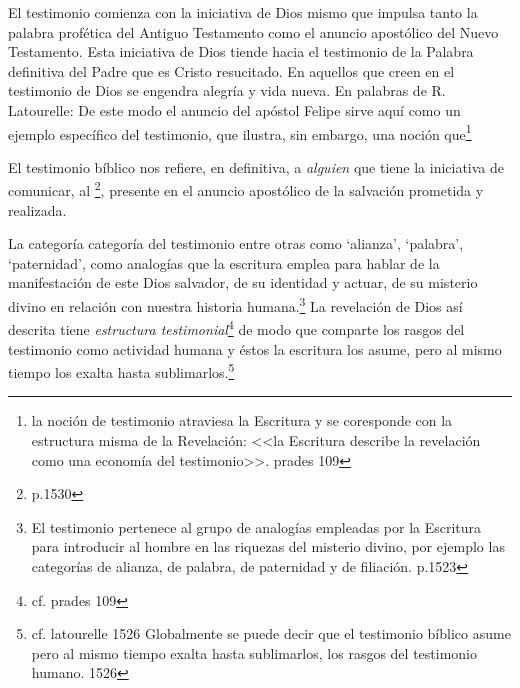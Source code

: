 El testimonio comienza con la iniciativa de Dios mismo que impulsa tanto la
palabra profética del Antiguo Testamento como el anuncio apostólico del Nuevo
Testamento. Esta iniciativa de Dios tiende hacia el testimonio de la Palabra
definitiva del Padre que es Cristo resucitado. En aquellos que creen en el
testimonio de Dios se engendra alegría y vida nueva. En palabras de R.
Latourelle: 
De este modo el anuncio del apóstol Felipe sirve aquí como un ejemplo específico
del testimonio, que ilustra, sin embargo, una noción
que\footnote{la noción de testimonio atraviesa
  la Escritura y se coresponde con la estructura misma de la Revelación: <<la
  Escritura describe la revelación como una economía del testimonio>>. prades
  109}

El testimonio bíblico nos refiere, en definitiva, a \emph{alguien} que tiene la
iniciativa de comunicar, al \footnote{p.1530}, presente en el anuncio
apostólico de la salvación prometida y realizada.


La categoría
categoría del testimonio entre otras como `alianza', `palabra', `paternidad',
como analogías que la escritura emplea para hablar de la manifestación de este
Dios salvador, de su identidad y actuar, de su misterio divino en relación con
nuestra historia humana.\footnote{El testimonio pertenece al grupo de analogías
  empleadas por la Escritura para introducir al hombre en las riquezas del
  misterio divino, por ejemplo las categorías de alianza, de palabra, de
  paternidad y de filiación. p.1523} La revelación de Dios así descrita tiene
\emph{estructura testimonial}\footnote{cf. prades 109} de modo que comparte los
rasgos del testimonio como actividad humana y éstos la escritura los asume, pero
al mismo tiempo los exalta hasta sublimarlos.\footnote{cf. latourelle 1526
  Globalmente se puede decir que el testimonio bíblico asume pero al mismo
  tiempo exalta hasta sublimarlos, los rasgos del testimonio humano. 1526}

